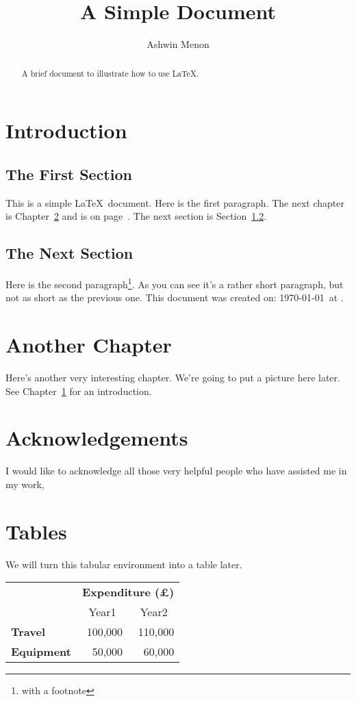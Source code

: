\documentclass[12pt]{scrreprt}
\title{A Simple Document}
\author{Ashwin Menon}
\begin{document}
\maketitle

\tableofcontents

\begin{abstract}
A brief document to illustrate how to use \LaTeX.    
\end{abstract}

\chapter{Introduction}
\label{ch:intro}

\section{The First Section}
This is a simple \LaTeX\ document. Here is the first paragraph.
The next chapter is Chapter~\ref{ch:another}
and is on page~\pageref{ch:another}.
The next section is Section~\ref{sec:next}.

\section{The Next Section}
\label{sec:next}

Here is the second paragraph\footnote{with a footnote}. As you
can see it's a rather short paragraph, but not as short as the
previous one. This document was created on: \today\ at \currenttime.

\chapter{Another Chapter}
\label{ch:another}

Here's another very interesting chapter.
We're going to put a picture here later.
See Chapter~\ref{ch:intro} for an introduction.

\chapter*{Acknowledgements}

I would like to acknowledge all those
very helpful people who have assisted me in my work,

\appendix

\chapter{Tables}
We will turn this tabular environment into a table later.

\begin{tabular}{lrr}
                     & \multicolumn{2}{c}{\bfseries Expenditure (\pounds)} \\
                     & \multicolumn{1}{c}{Year1} & \multicolumn{1}{c}{Year2} \\
 \bfseries Travel    & 100,000 & 110,000 \\
 \bfseries Equipment & 50,000  & 60,000
\end{tabular}
\end{document}
